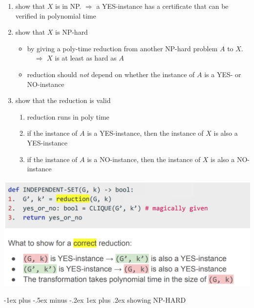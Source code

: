 \documentclass[10pt,landscape]{article}
\makeatletter
\renewcommand{\subsubsection}{\@startsection{subsubsection}{3}{0mm}%
                                {-1ex plus -.5ex minus -.2ex}%
                                {1ex plus .2ex}%
                                {\normalfont\small\bfseries}}
\newcommand{\1}{\mathmybb{1}}
\newenvironment{tightcenter}{%
  \setlength\topsep{0pt}
  \setlength\parskip{0pt}
  \begin{center}
    }{%
  \end{center}
}
\makeatother
\begin{document}
\begin{multicols*}{3}
  \begin{enumerate}[topsep=0pt,noitemsep,wide=0pt, leftmargin=\dimexpr\labelwidth + 2\labelsep\relax]
    \item show that $X$ is in NP. $\Rightarrow$ a YES-instance has a certificate that can be verified in polynomial time
    \item show that $X$ is NP-hard
      \begin{itemize}[topsep=0pt,noitemsep,wide=0pt, leftmargin=\dimexpr{} + 2\relax]
        \item by giving a poly-time reduction from another NP-hard problem $A$ to $X$.
          $\quad \Rightarrow$ $X$ is at least as hard as $A$
        \item reduction should \textit{not} depend on whether the instance of $A$ is a YES- or NO-instance
      \end{itemize}
    \item show that the reduction is valid
      \begin{enumerate}[topsep=0pt,noitemsep,wide=0pt, leftmargin=\dimexpr\labelwidth + 2\labelsep\relax]
        \item reduction runs in poly time
        \item if the instance of $A$ is a YES-instance, then the instance of $X$ is also a YES-instance
        \item if the instance of $A$ is a NO-instance, then the instance of $X$ is also a NO-instance
      \end{enumerate}
  \end{enumerate}

  \begin{tightcenter}
    \includegraphics[width=0.98\linewidth]{images/shownpcomplete.png} 
  \end{tightcenter}

  \subsubsection{showing NP-HARD}


\end{multicols*}
\end{document}
